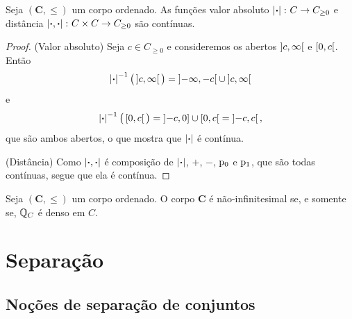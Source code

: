 \begin{proposition}
Seja $(\bm C,\leq)$ um corpo ordenado. As funções valor absoluto $\left\vert{\bm{\cdot}}\right\vert\colon C \to C_{\geq 0}$ e distância $\left\vert{\bm{\cdot}},{\bm{\cdot}}\right\vert\colon C \times C \to C_{\geq 0}$ são contínuas.
\end{proposition}
\begin{proof}
(Valor absoluto) Seja $c \in C_{\geq 0}$ e consideremos os abertos $\left]{c},{\infty}\right[$ e $\left[{0},{c}\right[$. Então
	\begin{equation*}
	\left\vert{\bm{\cdot}}\right\vert^{-1} \big( \left]{c},{\infty}\right[ \big) = \left]{-\infty},{-c}\right[ \cup \left]{c},{\infty}\right[
	\end{equation*}
e
	\begin{equation*}
	\left\vert{\bm{\cdot}}\right\vert^{-1} \big( \left[{0},{c}\right[ \big) = \left]{-c},{0}\right] \cup \left[{0},{c}\right[ = \left]{-c},{c}\right[,
	\end{equation*}
que são ambos abertos, o que mostra que $\left\vert{\bm{\cdot}}\right\vert$ é contínua.

(Distância) Como $\left\vert{\bm{\cdot}},{\bm{\cdot}}\right\vert$ é composição de $\left\vert{\bm{\cdot}}\right\vert$, $+$, $-$, $\mathrm{p}_0$ e $\mathrm{p}_1$, que são todas contínuas, segue que ela é contínua.
\end{proof}





\begin{proposition}
Seja $(\bm C,\leq)$ um corpo ordenado. O corpo $\bm C$ é não-infinitesimal se, e somente se, $\mathbb{Q}_C$ é denso em $C$.
\end{proposition}

\section{Separação}

\subsection{Noções de separação de conjuntos}

